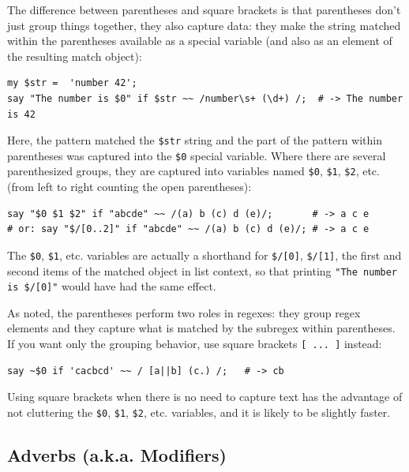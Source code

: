 The difference between parentheses and square brackets is 
that parentheses don't just group things together, 
they also capture data: they make the string matched within 
the parentheses available as a special variable (and also 
as an element of the resulting match object):

\begin{verbatim}
my $str =  'number 42';
say "The number is $0" if $str ~~ /number\s+ (\d+) /;  # -> The number is 42
\end{verbatim}
%

Here, the pattern matched the \verb'$str' string and the 
part of the pattern within parentheses was captured into 
the \verb'$0' special variable. Where there are several 
parenthesized groups, they are captured into variables 
named \verb'$0', \verb'$1',  \verb'$2', etc. (from 
left to right counting the open parentheses):

\begin{verbatim}
say "$0 $1 $2" if "abcde" ~~ /(a) b (c) d (e)/;       # -> a c e
# or: say "$/[0..2]" if "abcde" ~~ /(a) b (c) d (e)/; # -> a c e
\end{verbatim}
%

The \verb'$0', \verb'$1', etc. variables are actually a 
shorthand for \verb'$/[0]', \verb'$/[1]', the first and 
second items of the matched 
object in list context, so that printing  
\verb'"The number is $/[0]"' would have had the same 
effect. 

As noted, the parentheses perform two roles in regexes: 
they group regex elements and they capture what is matched 
by the subregex within parentheses. If you want only the 
grouping behavior, use square brackets
\verb'[ ... ]' instead:

\begin{verbatim}
say ~$0 if 'cacbcd' ~~ / [a||b] (c.) /;   # -> cb
\end{verbatim}
%

Using square brackets when there is no need to capture 
text has the advantage of not cluttering the \verb'$0', 
\verb'$1', \verb'$2', etc. variables, and it is likely 
to be slightly faster.

\subsection{Adverbs (a.k.a. Modifiers)}
\label{adverb}

